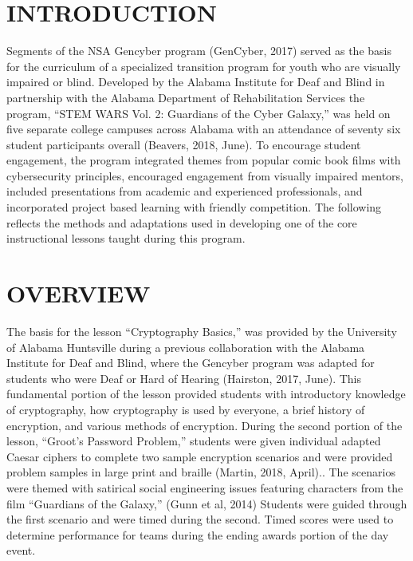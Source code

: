 \documentclass[11.5pt]{sig-alternate} %
\begin{document}
\begin{large}
\section*{INTRODUCTION}

Segments of the NSA Gencyber program (GenCyber, 2017) served as the basis for the curriculum of a specialized transition program for youth who are visually impaired or blind. Developed by the Alabama Institute for Deaf and Blind in partnership with the Alabama Department of Rehabilitation Services the program, “STEM WARS Vol. 2: Guardians of the Cyber Galaxy,” was held on five separate college campuses across Alabama with an attendance of seventy six student participants overall (Beavers, 2018, June). To encourage student engagement, the program integrated themes from popular comic book films with cybersecurity principles, encouraged engagement from visually impaired mentors, included presentations from academic and experienced  professionals, and incorporated project based learning with friendly competition. The following reflects the methods and adaptations used in developing one of the core instructional  lessons taught during this program.      

\section*{OVERVIEW}

The basis for the lesson “Cryptography Basics,”  was provided by the University of Alabama Huntsville during a previous collaboration with the Alabama Institute for Deaf and Blind, where the Gencyber program was adapted for students who were Deaf or Hard of Hearing (Hairston, 2017, June). This fundamental portion of the lesson provided students with introductory knowledge of cryptography, how cryptography is used by everyone, a brief history of encryption, and various methods of encryption. During the second portion of the lesson, “Groot’s Password Problem,”  students were given individual adapted Caesar ciphers to complete two sample encryption scenarios and were provided problem samples in large print and braille (Martin, 2018, April).. The scenarios were themed with satirical social engineering issues featuring characters from the film “Guardians of the Galaxy,” (Gunn et al, 2014) Students were guided through the first scenario and were timed during the second. Timed scores were used to determine performance for teams during the ending awards portion of the day event.


\end{large}
\end{document}
